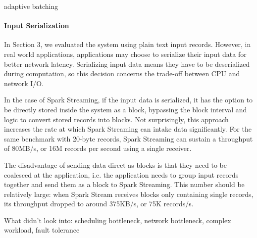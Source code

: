 adaptive batching

\paragraph{Input Serialization}
In Section 3, we evaluated the system using plain text input records. However, in real world applications, applications may choose to serialize their input data for better network latency. Serializing input data means they have to be deserialized during computation, so this decision concerns the trade-off between CPU and network I/O.

In the case of Spark Streaming, if the input data is serialized, it has the option to be directly stored inside the system as a block, bypassing the block interval and logic to convert stored records into blocks. Not surprisingly, this approach increases the rate at which Spark Streaming can intake data significantly. For the same benchmark with 20-byte records, Spark Streaming can sustain a throughput of 80MB/s, or 16M records per second using a single receiver.

The disadvantage of sending data direct as blocks is that they need to be coalesced at the application, i.e. the application needs to group input records together and send them as a block to Spark Streaming. This number should be relatively large: when Spark Stream receives blocks only containing single records, its throughput dropped to around 375KB/s, or 75K records/s.




What didn't look into: scheduling bottleneck, network bottleneck, complex workload, fault tolerance
